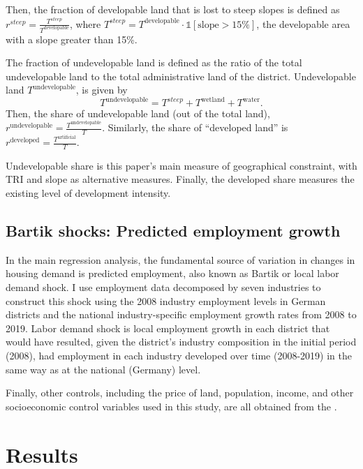 \documentclass[
  12pt,
]{article}
\begin{document}
Then, the fraction of developable land that is lost to steep slopes is
defined as \(r^{steep} = \frac{T^{steep}}{T^{\text{developable}}}\),
where
\(T^{steep} = T^{\text{developable}} \cdot\mathbb{1}\left[{\text{slope} > 15\%}\right]\),
the developable area with a slope greater than 15\%.

The fraction of undevelopable land is defined as the ratio of the total
undevelopable land to the total administrative land of the district.
Undevelopable land \(T^{\text{undevelopable}}\), is given by \[
T^{\text{undevelopable}} = T^{steep} + T^{\text{wetland}} + T^{\text{water}}.
\] Then, the share of undevelopable land (out of the total land),
\(r^{\text{undevelopable}} = \frac{T^{\text{undevelopable}}}{T}\).
Similarly, the share of ``developed land'' is
\(r^{\text{developed}} = \frac{T^{\text{artificial}}}{T}\).

Undevelopable share is this paper's main measure of geographical
constraint, with TRI and slope as alternative measures. Finally, the
developed share measures the existing level of development intensity.

\subsection{Bartik shocks: Predicted employment
growth}\label{bartik-shocks-predicted-employment-growth}

In the main regression analysis, the fundamental source of variation in
changes in housing demand is predicted employment, also known as Bartik
or local labor demand shock. I use employment data decomposed by seven
industries to construct this shock using the 2008 industry employment
levels in German districts and the national industry-specific employment
growth rates from 2008 to 2019. Labor demand shock is local employment
growth in each district that would have resulted, given the district's
industry composition in the initial period (2008), had employment in
each industry developed over time (2008-2019) in the same way as at the
national (Germany) level.

Finally, other controls, including the price of land, population,
income, and other socioeconomic control variables used in this study,
are all obtained from the \citet{atlasde_2022}.

\section{Results}\label{results}
\end{document}
